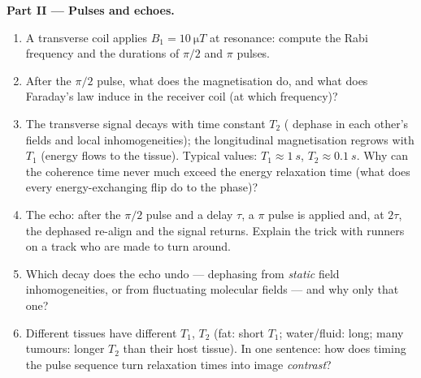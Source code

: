 \begin{problem}
\medskip\noindent\textbf{Part II --- Pulses and echoes.}
\begin{enumerate}[resume]
  \item A transverse coil applies $B_1 = \qty{10}{\micro T}$ at
        resonance: compute the Rabi frequency and the durations of
        $\pi/2$ and $\pi$ pulses.
  \item After the $\pi/2$ pulse, what does the magnetisation do,
        and what does Faraday's law induce in the receiver coil (at
        which frequency)?
  \item The transverse signal decays with time constant $T_2$
        ( dephase in each other's fields and local
        inhomogeneities); the longitudinal magnetisation regrows
        with $T_1$ (energy flows to the tissue). Typical values:
        $T_1 \approx \qty{1}{s}$, $T_2 \approx \qty{0.1}{s}$. Why
        can the coherence time never much exceed the energy
        relaxation time (what does every energy-exchanging flip do
        to the phase)?
  \item The  echo: after the $\pi/2$ pulse and a delay $\tau$,
        a $\pi$ pulse is applied and, at $2\tau$, the dephased
         re-align and the signal returns. Explain the trick
        with runners on a track who are made to turn around.
  \item Which decay does the echo undo --- dephasing from
        \emph{static} field inhomogeneities, or from fluctuating
        molecular fields --- and why only that one?
  \item Different tissues have different $T_1$, $T_2$ (fat:
        short $T_1$; water/fluid: long; many tumours: longer $T_2$
        than their host tissue). In one sentence: how does timing
        the pulse sequence turn relaxation times into image
        \emph{contrast}?
\end{enumerate}


\end{problem}
